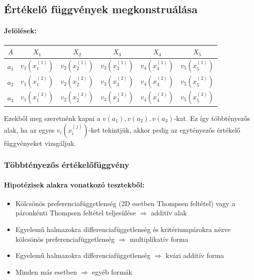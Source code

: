 \documentclass[a4paper,12pt]{article}
\begin{document}
\subsection{Értékelő függvények megkonstruálása}

\paragraph{Jelölések:}

\begin{center}
\begin{tabular}{c||c|c|c|c|c}
 $A$ & $X_1$& $X_2$& $X_3$& $X_4$& $X_5$ \\
 \hline
 $a_1$&$v_1(x^{(1)}_{1})$  &$v_2(x^{(1)}_{2})$ & $v_3(x^{(1)}_{3})$ & $v_4(x^{(1)}_{4})$& $v_5(x^{(1)}_{5})$ \\
 $a_2$&$v_1(x^{(2)}_{1})$  &$v_2(x^{(2)}_{2})$ & $v_3(x^{(2)}_{3})$ & $v_4(x^{(2)}_{4})$& $v_5(x^{(2)}_{5})$ \\
 $a_3$&$v_1(x^{(3)}_{1})$  &$v_2(x^{(3)}_{2})$ & $v_3(x^{(3)}_{3})$ & $v_4(x^{(3)}_{4})$& $v_5(x^{(3)}_{5})$ \\
\end{tabular}
\end{center}
Ezekből meg szeretnénk kapni a $v(a_1), v(a_2), v(a_3)$-kat. Ez így többtényezős alak, ha az egyes $v_i(x^{(j)}_{i})$-ket tekintjük, akkor pedig az egytényezős értékelő függvényeket vizsgáljuk.

\subsubsection{Többtényezős értékelőfüggvény}

\paragraph{Hipotézisek alakra vonatkozó tesztekből:} 

\begin{itemize}
\item Kölcsönös preferenciafüggetlenség (2D esetben Thompsen feltétel) vagy a páronkénti Thompsen feltétel teljesülése $\Rightarrow$ additív alak
\item Egyelemű halmazokra differenciafüggetlenség és kritériumpárokra nézve kölcsönös preferenciafüggetlenség  $\Rightarrow$ multiplikatív forma
\item Egyelemű halmazokra differenciafüggetlenség  $\Rightarrow$ kvázi additív forma
\item Minden más esetben  $\Rightarrow$ egyéb formák

\end{itemize}
\end{document}
